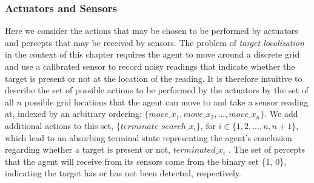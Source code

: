 \subsubsection{Actuators and Sensors}
Here we consider the actions that may be chosen to be performed by actuators and percepts that may be received by sensors. The problem of \textit{target localization} in the context of this chapter requires the agent to move around a discrete grid and use a calibrated sensor to record noisy readings that indicate whether the target is present or not at the location of the reading. It is therefore intuitive to describe the set of possible actions to be performed by the actuators by the set of all $n$ possible grid locations that the agent can move to and take a sensor reading at, indexed by an arbitrary ordering: $\{move\_x_1, move\_x_2, ..., move\_x_n\}$. We add additional actions to this set, $\{terminate\_search\_x_{i}\}$, for $i \in \{1, 2, ..., n, n+1\}$, which lead to an absorbing terminal state representing the agent's conclusion regarding whether a target is present or not, $terminated\_x_{i}$ . The set of percepts that the agent will receive from its sensors come from the binary set \{1, 0\}, indicating the target has or has not been detected, respectively.